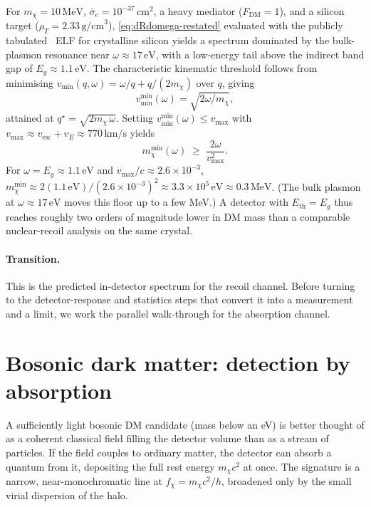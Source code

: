 \begin{example}
\label{ex:Si-electron-spectrum}
For $m_\chi=10\,\text{MeV}$, $\bar\sigma_e=10^{-37}\,\text{cm}^2$,
a heavy mediator ($F_\text{DM}=1$), and a silicon target
($\rho_T=2.33\,\text{g/cm}^3$), \cref{eq:dRdomega-restated}
evaluated with the publicly tabulated~\cite{knapen2021} ELF for
crystalline silicon yields a spectrum dominated by the
bulk-plasmon resonance near $\omega\approx 17\,\text{eV}$, with a
low-energy tail above the indirect band gap of
$E_g\approx 1.1\,\text{eV}$. The characteristic kinematic threshold
follows from minimising
$v_\text{min}(q,\omega)=\omega/q+q/(2 m_\chi)$ over $q$, giving
\begin{equation}
v_\text{min}^\text{min}(\omega) = \sqrt{2\omega/m_\chi},
\end{equation}
attained at $q^\star=\sqrt{2 m_\chi\,\omega}$. Setting
$v_\text{min}^\text{min}(\omega) \leq v_\text{max}$ with
$v_\text{max}\approx v_\text{esc}+v_E\approx 770\,\text{km}/\text{s}$
yields
\begin{equation}
m_\chi^\text{min}(\omega) \;\geq\; \frac{2\omega}{v_\text{max}^2}.
\end{equation}
For $\omega=E_g\approx 1.1\,\text{eV}$ and $v_\text{max}/c\approx
2.6\times 10^{-3}$, $m_\chi^\text{min}\approx
2(1.1\,\text{eV})/(2.6\times 10^{-3})^2 \approx 3.3\times 10^{5}\,\text{eV}
\approx 0.3\,\text{MeV}$. (The bulk plasmon at $\omega\approx 17\,\text{eV}$
moves this floor up to a few MeV.) A detector with $E_\text{th}=E_g$
thus reaches roughly two orders of magnitude lower in DM mass than
a comparable nuclear-recoil analysis on the same crystal.
\end{example}

\paragraph{Transition.}
This is the predicted in-detector spectrum for the recoil channel.
Before turning to the detector-response and statistics steps that
convert it into a measurement and a limit, we work the parallel
walk-through for the absorption channel.

\section{Bosonic dark matter: detection by absorption}
\label{sec:boson-dm}

\begin{phenomenon}
A sufficiently light bosonic DM candidate (mass below an eV) is
better thought of as a coherent classical field filling the
detector volume than as a stream of particles. If the field couples
to ordinary matter, the detector can absorb a quantum from it,
depositing the full rest energy $m_\chi c^2$ at once. The signature
is a narrow, near-monochromatic line at $f_\chi=m_\chi c^2/h$,
broadened only by the small virial dispersion of the halo.
\end{phenomenon}

